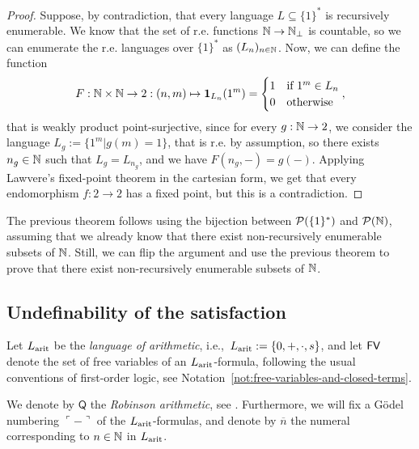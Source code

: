\begin{proof}
    Suppose, by contradiction, that every language $L \subseteq \{1\}^*$ is recursively enumerable.
    We know that the set of r.e. functions $\mathbb{N} \to \mathbb{N}_\bot$ is countable, so we can enumerate the r.e. languages over $\{1\}^*$ as $(L_n)_{n \in \mathbb{N}}$.
    Now, we can define the function
    \[ F : \mathbb{N} \times \mathbb{N} \to 2 : (n,m) \mapsto \mathbf{1}_{L_n}(1^m) = \begin{cases}
        1 &\text{if $1^m \in L_n$} \\
        0 &\text{otherwise}
    \end{cases}, \]
    that is weakly product point-surjective, since for every $g : \mathbb{N} \to 2$, we consider the language $L_g := \{1^m | g(m) = 1\}$, that is r.e. by assumption,
    so there exists $n_g \in \mathbb{N}$ such that $L_g = L_{n_g}$, and we have $F(n_g,-) = g(-)$. Applying Lawvere's fixed-point theorem in the cartesian form, we get
    that every endomorphism $f : 2 \to 2$ has a fixed point, but this is a contradiction.
\end{proof}

\begin{remark}
    The previous theorem follows using the bijection between $\mathcal{P}(\{1\}^*)$ and $\mathcal{P}(\mathbb{N})$, assuming that we already know
    that there exist non-recursively enumerable subsets of $\mathbb{N}$. Still, we can flip the argument
    and use the previous theorem to prove that there exist non-recursively enumerable subsets of $\mathbb{N}$.
\end{remark}


\subsection*{Undefinability of the satisfaction}

\begin{definition}
    Let $L_{\textnormal{arit}}$ be the \emph{language of arithmetic}, i.e.,\ $L_{\textnormal{arit}} := \{0,+,\cdot,s\}$, and let $\textsf{FV}$ denote the set of free variables of an $L_{\textnormal{arit}}$-formula,
    following the usual conventions of first-order logic, see Notation~\ref{not:free-variables-and-closed-terms}.
\end{definition}

\begin{notation}\label{idx:godel-coding}
    We denote by $\mathsf{Q}$ the \emph{Robinson arithmetic}, see \Cite[\S~10.3, p.~67]{Smith2013}. Furthermore, we will fix a Gödel numbering $\ulcorner - \urcorner$ of the $L_{\textnormal{arit}}$-formulas,
    and denote by $\overline{n}$ the numeral corresponding to $n \in \mathbb{N}$ in $L_{\textnormal{arit}}$.~\cite[\S~5.2, p.~37, and \S~19.1, pp.~136--137]{Smith2013}
\end{notation}

